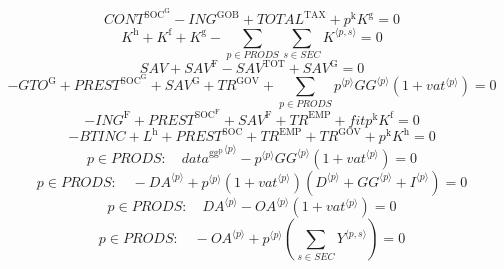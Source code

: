 \begin{equation}
{C\!O\!N\!T}^{\mathrm{SOC}^{\mathrm{G}}} - {I\!N\!G}^{\mathrm{GOB}} + {T\!O\!T\!A\!L}^{\mathrm{TAX}} + {p^{\mathrm{k}}} {K^{\mathrm{g}}} = 0
\end{equation}
\begin{equation}
K^{\mathrm{h}} + K^{\mathrm{f}} + K^{\mathrm{g}} - \sum_{p\in {P\!R\!O\!D\!S}} \sum_{s\in {S\!E\!C}} {K}^{\langle p,s\rangle} = 0
\end{equation}
\begin{equation}
{S\!A\!V} + {S\!A\!V}^{\mathrm{F}} - {S\!A\!V}^{\mathrm{TOT}} + {S\!A\!V}^{\mathrm{G}} = 0
\end{equation}
\begin{equation}
-{G\!T\!O}^{\mathrm{G}} + {P\!R\!E\!S\!T}^{\mathrm{SOC}^{\mathrm{G}}} + {S\!A\!V}^{\mathrm{G}} + {T\!R}^{\mathrm{GOV}} + \sum_{p\in {P\!R\!O\!D\!S}} {{p}^{\langle p\rangle}} {{{G\!G}}^{\langle p\rangle}} \left(1 + {{v\!a\!t}}^{\langle p\rangle}\right) = 0
\end{equation}
\begin{equation}
-{I\!N\!G}^{\mathrm{F}} + {P\!R\!E\!S\!T}^{\mathrm{SOC}^{\mathrm{F}}} + {S\!A\!V}^{\mathrm{F}} + {T\!R}^{\mathrm{EMP}} + {{f\!i\!t}} {p^{\mathrm{k}}} {K^{\mathrm{f}}} = 0
\end{equation}
\begin{equation}
-{B\!T\!I\!N\!C} + L^{\mathrm{h}} + {P\!R\!E\!S\!T}^{\mathrm{SOC}} + {T\!R}^{\mathrm{EMP}} + {T\!R}^{\mathrm{GOV}} + {p^{\mathrm{k}}} {K^{\mathrm{h}}} = 0
\end{equation}
\begin{equation}
p\in {P\!R\!O\!D\!S}\colon\quad {{d\!a\!t\!a}^{\mathrm{gg}^{\mathrm{p}}}}^{\langle p\rangle} - {{p}^{\langle p\rangle}} {{{G\!G}}^{\langle p\rangle}} \left(1 + {{v\!a\!t}}^{\langle p\rangle}\right) = 0
\end{equation}
\begin{equation}
p\in {P\!R\!O\!D\!S}\colon\quad -{{D\!A}}^{\langle p\rangle} + {{p}^{\langle p\rangle}} \left(1 + {{v\!a\!t}}^{\langle p\rangle}\right) \left({D}^{\langle p\rangle} + {{G\!G}}^{\langle p\rangle} + {I}^{\langle p\rangle}\right) = 0
\end{equation}
\begin{equation}
p\in {P\!R\!O\!D\!S}\colon\quad {{D\!A}}^{\langle p\rangle} - {{{O\!A}}^{\langle p\rangle}} \left(1 + {{v\!a\!t}}^{\langle p\rangle}\right) = 0
\end{equation}
\begin{equation}
p\in {P\!R\!O\!D\!S}\colon\quad -{{O\!A}}^{\langle p\rangle} + {{p}^{\langle p\rangle}} \left(\sum_{s\in {S\!E\!C}} {Y}^{\langle p,s\rangle}\right) = 0
\end{equation}
